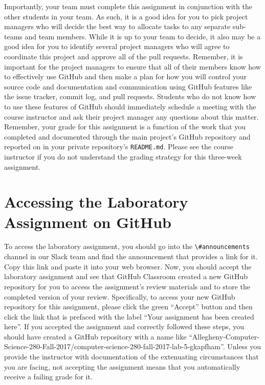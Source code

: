 \documentclass[11pt]{article}
\newcommand{\reflection}{\lstinline{README.md}}
\newcommand{\channel}[1]{\lstinline{#1}}
\begin{document}
Importantly, your team must complete this assignment in conjunction with the other students in your team. As such, it is
a good idea for you to pick project managers who will decide the best way to allocate tasks to any separate sub-teams
and team members. While it is up to your team to decide, it also may be a good idea for you to identify several project
managers who will agree to coordinate this project and approve all of the pull requests. Remember, it is important for
the project managers to ensure that all of their members know how to effectively use GitHub and then make a plan for how
you will control your source code and documentation and communication using GitHub features like the issue tracker,
commit log, and pull requests. Students who do not know how to use these features of GitHub should immediately schedule
a meeting with the course instructor and ask their project manager any questions about this matter. Remember, your grade
for this assignment is a function of the work that you completed and documented through the main project's GitHub
repository and reported on in your private repository's \reflection{}. Please see the course instructor if you do not
understand the grading strategy for this three-week assignment.

\section*{Accessing the Laboratory Assignment on GitHub}

To access the laboratory assignment, you should go into the \channel{\#announcements} channel in our Slack team and find
the announcement that provides a link for it. Copy this link and paste it into your web browser. Now, you should accept
the laboratory assignment and see that GitHub Classroom created a new GitHub repository for you to access the
assignment's review materials and to store the completed version of your review. Specifically, to access your new
GitHub repository for this assignment, please click the green ``Accept'' button and then click the link that is prefaced
with the label ``Your assignment has been created here''. If you accepted the assignment and correctly followed these
steps, you should have created a GitHub repository with a name like
``Allegheny-Computer-Science-280-Fall-2017/computer-science-280-fall-2017-lab-5-gkapfham''. Unless you provide the
instructor with documentation of the extenuating circumstances that you are facing, not accepting the assignment means
that you automatically receive a failing grade for it.
\end{document}
